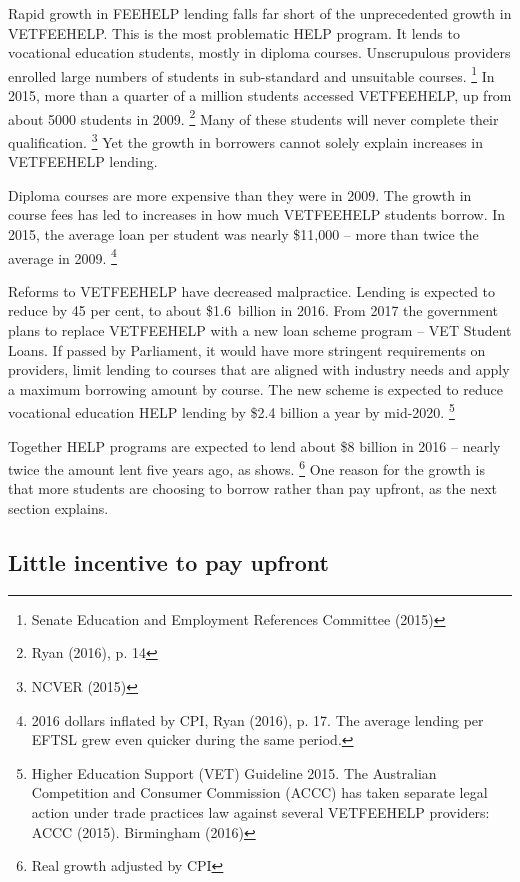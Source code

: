 \documentclass[embargoed]{grattan}
\begin{document}
{Rapid growth in \gls{FEEHELP} lending falls far short of the unprecedented growth in \gls{VETFEEHELP}.
This is the most problematic \gls{HELP} program.
It lends to vocational education students, mostly in diploma courses.
Unscrupulous providers enrolled large numbers of students in sub-standard and unsuitable courses.%
\footnote{Senate Education and Employment References Committee (2015)} In 2015, more than a quarter of a million students accessed \gls{VETFEEHELP}, up from about 5000 students in 2009.%
\footnote{Ryan (2016), p. 14} Many of these students will never complete their qualification.%
\footnote{NCVER (2015)} Yet the growth in borrowers cannot solely explain increases in \gls{VETFEEHELP} lending.

Diploma courses are more expensive than they were in 2009.
The growth in course fees has led to increases in how much \gls{VETFEEHELP} students borrow.
In 2015, the average loan per student was nearly \$11,000 -- more than twice the average in 2009.%
\footnote{2016 dollars inflated by \gls{CPI}, Ryan (2016), p. 17.
The average lending per \gls{EFTSL} grew even quicker during the same period.}

Reforms to \gls{VETFEEHELP} have decreased malpractice.
Lending is expected to reduce by 45 per cent, to about \$1.6~billion in 2016.
From 2017 the government plans to replace \gls{VETFEEHELP} with a new loan scheme program -- VET Student Loans.
If passed by Parliament, it would have more stringent requirements on providers, limit lending to courses that are aligned with industry needs and apply a maximum borrowing amount by course.
The new scheme is expected to reduce vocational education \gls{HELP} lending by \$2.4 billion a year by mid-2020.%
\footnote{Higher Education Support (VET) Guideline 2015.
The Australian Competition and Consumer Commission (ACCC) has taken separate legal action under trade practices law against several \gls{VETFEEHELP} providers: ACCC (2015).
Birmingham (2016)}

Together \gls{HELP} programs are expected to lend about \$8 billion in 2016 -- nearly twice the amount lent five years ago, as  shows.%
\footnote{Real growth adjusted by \gls{CPI}} One reason for the growth is that more students are choosing to borrow rather than pay upfront, as the next section explains.

\subsection{Little incentive to pay upfront}\label{subsec:little-incentive-to-pay-upfront}

}
\end{document}
